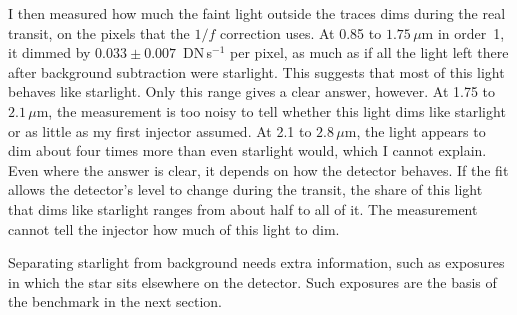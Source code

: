 I then measured how much the faint light outside the traces dims during the real transit, on the pixels that the $1/f$ correction uses. At 0.85 to $1.75\,\mu\mathrm{m}$ in order~1, it dimmed by $0.033\pm0.007$~DN\,s$^{-1}$ per pixel, as much as if all the light left there after background subtraction were starlight. This suggests that most of this light behaves like starlight. Only this range gives a clear answer, however. At 1.75 to $2.1\,\mu\mathrm{m}$, the measurement is too noisy to tell whether this light dims like starlight or as little as my first injector assumed. At 2.1 to $2.8\,\mu\mathrm{m}$, the light appears to dim about four times more than even starlight would, which I cannot explain. Even where the answer is clear, it depends on how the detector behaves. If the fit allows the detector's level to change during the transit, the share of this light that dims like starlight ranges from about half to all of it. The measurement cannot tell the injector how much of this light to dim.

Separating starlight
from background needs extra information, such as exposures in which the star
sits elsewhere on the detector. Such exposures are the basis of the benchmark
in the next section.
